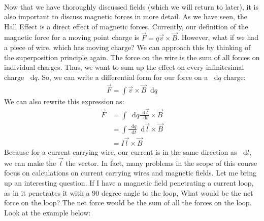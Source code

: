 \documentclass{article}
\newcommand*\dif{\mathop{}\!\mathrm{d}}
\begin{document}
\\
Now that we have thoroughly discussed fields (which we will return to later), it is also important to discuss magnetic forces in more detail. As we have seen, the Hall Effect is a direct effect of magnetic forces. Currently, our definition of the magnetic force for a moving point charge is $\vec{F} = q\vec{v}\times\vec{B}$. However, what if we had a piece of wire, which has moving charge? We can approach this by thinking of the superposition principle again. The force on the wire is the sum of all forces on individual charges. Thus, we want to sum up the effect on every infinitesimal charge $\dif q$. So, we can write a differential form for our force on a $\dif q$ charge: 
\begin{align*}
    \vec{F} = \int \vec{v}\times\vec{B}\dif q
\end{align*}
We can also rewrite this expression as:
\begin{align*}
    \vec{F} &= \int \dif q \frac{\dif \vec{l}}{\dif t} \times \vec{B}\\
    &= \int \frac{\dif q}{\dif t} \dif \vec{l} \times \vec{B}\\
    &= I\vec{l} \times \vec{B}
\end{align*}
Because for a current carrying wire, our current is in the same direction as $\dif l$, we can make the $\vec{l}$ the vector. In fact, many problems in the scope of this course focus on calculations on current carrying wires and magnetic fields. Let me bring up an interesting question. If I have a magnetic field penetrating a current loop, as in it penetrates it with a $90$ degree angle to the loop, What would be the net force on the loop? The net force would be the sum of all the forces on the loop. Look at the example below:

\end{document}

